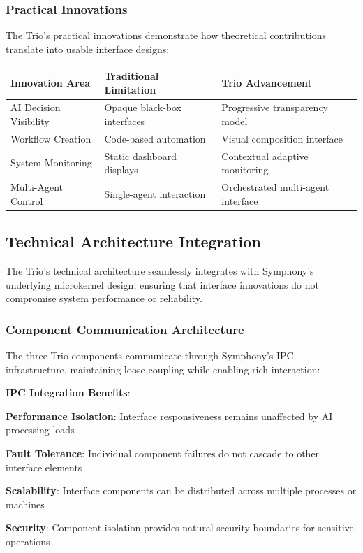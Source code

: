 \subsubsection*{Practical Innovations}

The Trio's practical innovations demonstrate how theoretical contributions translate into usable interface designs:

\begin{center}
\begin{tabular}{@{}lll@{}}
\toprule
\textbf{Innovation Area} & \textbf{Traditional Limitation} & \textbf{Trio Advancement} \\
\midrule
AI Decision Visibility & Opaque black-box interfaces & Progressive transparency model \\
Workflow Creation & Code-based automation & Visual composition interface \\
System Monitoring & Static dashboard displays & Contextual adaptive monitoring \\
Multi-Agent Control & Single-agent interaction & Orchestrated multi-agent interface \\
\bottomrule
\end{tabular}
\end{center}

\subsection*{Technical Architecture Integration}

The Trio's technical architecture seamlessly integrates with Symphony's underlying microkernel design, ensuring that interface innovations do not compromise system performance or reliability.

\subsubsection*{Component Communication Architecture}

The three Trio components communicate through Symphony's IPC infrastructure, maintaining loose coupling while enabling rich interaction:

\begin{alertbox}
\textbf{IPC Integration Benefits}:
\begin{compactlist}
    \item \textbf{Performance Isolation}: Interface responsiveness remains unaffected by AI processing loads
    \item \textbf{Fault Tolerance}: Individual component failures do not cascade to other interface elements
    \item \textbf{Scalability}: Interface components can be distributed across multiple processes or machines
    \item \textbf{Security}: Component isolation provides natural security boundaries for sensitive operations
\end{compactlist}
\end{alertbox}

